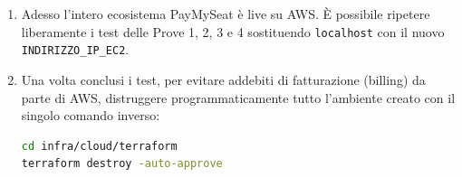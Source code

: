\documentclass[11pt,a4paper]{report}
\begin{document}
\begin{enumerate}
    \item Adesso l'intero ecosistema PayMySeat \`e live su AWS. \`E possibile ripetere liberamente i test delle Prove 1, 2, 3 e 4 sostituendo \texttt{localhost} con il nuovo \texttt{INDIRIZZO\_IP\_EC2}.
    
    \item Una volta conclusi i test, per evitare addebiti di fatturazione (billing) da parte di AWS, distruggere programmaticamente tutto l'ambiente creato con il singolo comando inverso:
    \begin{lstlisting}[language=bash]
cd infra/cloud/terraform
terraform destroy -auto-approve
    \end{lstlisting}
\end{enumerate}
\end{document}
